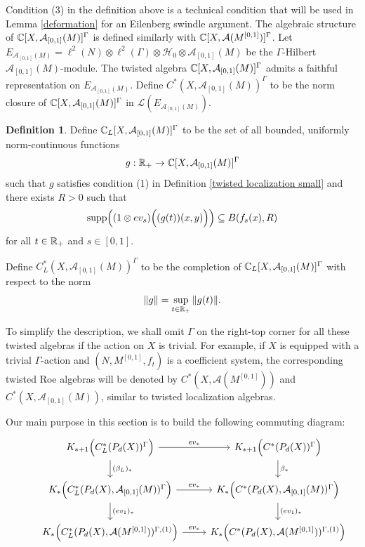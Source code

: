 \documentclass[11pt]{article}
\theoremstyle{definition}
\newtheorem{Def}{Definition}[section]
\theoremstyle{plain}
\def\A{\mathcal A}\def\C{\mathcal C}\def\B{\mathcal B}\def\E{\mathcal E}\def\O{\mathcal O}\def\h{\mathfrak h}\def\K{\mathcal K}\def\F{\mathcal F}\def\P{\mathcal P}\def\L{\mathcal L}\def\R{\mathcal R}\def\Q{\mathcal Q}\def\H{\mathcal H}\def\S{\mathcal S}\def\N{\mathcal N}\def\U{\mathcal U}\def\V{\mathcal V}
\def\supp{\textup{supp}}
\def\ox{\otimes}
\def\ox{\otimes}
\def\Ga{\Gamma}
\begin{document}
Condition (3) in the definition above is a technical condition that will be used in Lemma \ref{deformation} for an Eilenberg swindle argument.
The algebraic structure of $\IC[X,\A_{[0,1]}(M)]^{\Ga}$ is defined similarly with $\IC[X,\A(M^{[0,1]})]^{\Ga}$. Let $E_{\A_{[0,1]}(M)}=\ell^2(N)\ox\ell^2(\Ga)\ox\H_0\ox\A_{[0,1]}(M)$ be the $\Ga$-Hilbert $\A_{[0,1]}(M)$-module. The twisted algebra $\IC[X,\A_{[0,1]}(M)]^{\Ga}$ admits a faithful representation on $E_{\A_{[0,1]}(M)}$. Define $C^*(X,\A_{[0,1]}(M))^{\Ga}$ to be the norm closure of $\IC[X,\A_{[0,1]}(M)]^{\Ga}$ in $\L\left(E_{\A_{[0,1]}(M)}\right)$.

\begin{Def}\label{twist localization big}
Define $\IC_L[X,\A_{[0,1]}(M)]^{\Ga}$ to be the set of all bounded, uniformly norm-continuous functions
$$g:\IR_+\to\IC[X,\A_{[0,1]}(M)]^{\Ga}$$
such that $g$ satisfies condition (1) in Definition \ref{twisted localization small} and there exists $R>0$ such that
$$\supp\Big((1\ox ev_s)\Big((g(t))(x,y)\Big)\Big)\subseteq B(f_s(x),R)$$
for all $t\in\mathbb R_+$ and $s\in[0,1]$.

Define $C^*_L(X,\A_{[0,1]}(M))^{\Ga}$ to be the completion of $\IC_L[X,\A_{[0,1]}(M)]^{\Ga}$ with respect to the norm
$$\|g\|=\sup_{t\in\mathbb R_+}\|g(t)\|.$$
\end{Def}

To simplify the description, we shall omit $\Ga$ on the right-top corner for all these twisted algebras if the action on $X$ is trivial. For example, if $X$ is equipped with a trivial $\Ga$-action and $(N,M^{[0,1]},f_t)$ is a coefficient system, the corresponding twisted Roe algebras will be denoted by $C^*(X,\A(M^{[0,1]}))$ and $C^*(X,\A_{[0,1]}(M))$, similar to twisted localization algebras.

Our main purpose in this section is to build the following commuting diagram:
\begin{equation}\label{com diag}\begin{tikzcd}
& K_{*+1}\Big(C^*_L(P_d(X))^{\Ga}\Big) \arrow[r, "ev_*"] \arrow[d, "(\beta_L)_*"] & K_{*+1}\Big(C^*(P_d(X))^{\Ga}\Big) \arrow[d, "\beta_*"]   \\
& K_*\Big(C^*_L(P_d(X),\A_{[0,1]}(M))^{\Ga}\Big)\arrow[r, "ev_*"] \arrow[d, "(ev_1)_*"]& K_*\Big(C^*(P_d(X),\A_{[0,1]}(M))^{\Ga}\Big) \arrow[d, "(ev_1)_*"]\\
& K_*\Big(C^*_L(P_d(X),\A(M^{[0,1]}))^{\Ga,(1)}\Big)\arrow[r, "ev_*"] & K_*\Big(C^*(P_d(X),\A(M^{[0,1]}))^{\Ga,(1)}\Big)
\end{tikzcd}\end{equation}
\end{document}
